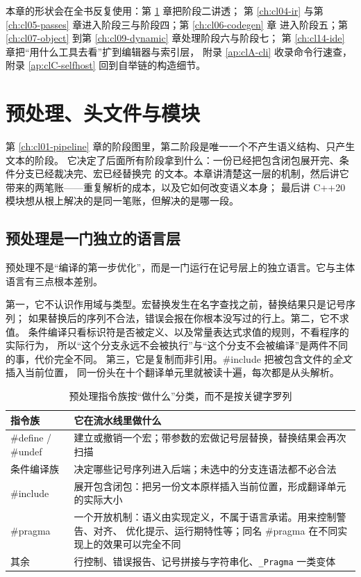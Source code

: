 \documentclass[12pt,a4paper,fontset=fandol]{ctexbook}
\newcommand{\cpp}[1]{C++#1}
\newcommand{\Tp}[1]{\texttt{#1}}
\begin{document}
本章的形状会在全书反复使用：第 \ref{ch:cl02-preprocessing} 章把阶段二讲透；
第 \ref{ch:cl04-ir} 与第 \ref{ch:cl05-passes} 章进入阶段三与阶段四；第 \ref{ch:cl06-codegen} 章
进入阶段五；第 \ref{ch:cl07-object} 到第 \ref{ch:cl09-dynamic} 章处理阶段六与阶段七；
第 \ref{ch:cl14-ide} 章把“用什么工具去看”扩到编辑器与索引层，
附录 \ref{ap:clA-cli} 收录命令行速查，附录 \ref{ap:clC-selfhost} 回到自举链的构造细节。

\chapter{预处理、头文件与模块}\label{ch:cl02-preprocessing}

第 \ref{ch:cl01-pipeline} 章的阶段图里，第二阶段是唯一一个不产生语义结构、只产生文本的阶段。
它决定了后面所有阶段拿到什么：一份已经把包含闭包展开完、条件分支已经裁决完、宏已经替换完
的文本。本章讲清楚这一层的机制，然后讲它带来的两笔账——重复解析的成本，以及它如何改变语义本身；
最后讲 \cpp{20} 模块想从根上解决的是同一笔账，但解决的是哪一段。

\section{预处理是一门独立的语言层}\label{sec:cl02-layer}

预处理不是“编译的第一步优化”，而是一门运行在记号层上的独立语言。它与主体语言有三点根本差别。

第一，它不认识作用域与类型。宏替换发生在名字查找之前，替换结果只是记号序列；
如果替换后的序列不合法，错误会报在你根本没写过的行上。第二，它不求值。
条件编译只看标识符是否被定义、以及常量表达式求值的规则，不看程序的实际行为，
所以“这个分支永远不会被执行”与“这个分支不会被编译”是两件不同的事，代价完全不同。
第三，它是复制而非引用。\#include 把被包含文件的\emph{全文}插入当前位置，
同一份头在十个翻译单元里就被读十遍，每次都是从头解析。

\begin{table}[htbp]
\centering
\begin{tabularx}{0.76\textwidth}{@{}>{\raggedright\arraybackslash}p{} X@{}}
\toprule
指令族 & 它在流水线里做什么 \\
\midrule
\#define / \#undef & 建立或撤销一个宏；带参数的宏做记号层替换，替换结果会再次扫描 \\
条件编译族 & 决定哪些记号序列进入后端；未选中的分支连语法都不必合法 \\
\#include & 展开包含闭包：把另一份文本原样插入当前位置，形成翻译单元的实际大小 \\
\#pragma & 一个开放机制：语义由实现定义，不属于语言承诺。用来控制警告、对齐、
优化提示、运行期特性等；同名 \#pragma 在不同实现上的效果可以完全不同 \\
其余 & 行控制、错误报告、记号拼接与字符串化、\Tp{\_Pragma} 一类变体 \\
\bottomrule
\end{tabularx}
\caption{预处理指令族按“做什么”分类，而不是按关键字罗列}\label{tab:cl02-directives}
\end{table}
\end{document}
